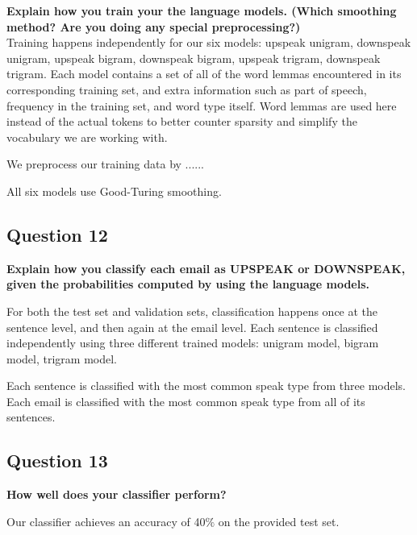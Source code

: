 \documentclass{article} %
\begin{document}
\textbf{Explain how you train your the language models. (Which smoothing method? Are you doing any special preprocessing?)}
\\

Training happens independently for our six models: upspeak unigram, downspeak unigram, upspeak bigram, downspeak bigram, upspeak trigram, downspeak trigram. Each model contains a set of all of the word lemmas encountered in its corresponding training set, and extra information such as part of speech, frequency in the training set, and word type itself. Word lemmas are used here instead of the actual tokens to better counter sparsity and simplify the vocabulary we are working with.

We preprocess our training data by ......

All six models use Good-Turing smoothing.

\subsection*{Question 12}

\textbf{Explain how you classify each email as UPSPEAK or DOWNSPEAK, given the probabilities computed by using the language models.}

For both the test set and validation sets, classification happens once at the sentence level, and then again at the email level. Each sentence is classified independently using three different trained models: unigram model, bigram model, trigram model. 

Each sentence is classified with the most common speak type from three models. Each email is classified with the most common speak type from all of its sentences.

\subsection*{Question 13}

\textbf{How well does your classifier perform?}

Our classifier achieves an accuracy of 40$\%$ on the provided test set.
\end{document}
